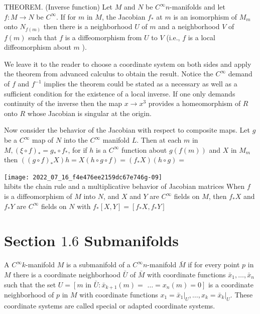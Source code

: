 \documentclass[10pt]{article}
\begin{document}
THEOREM. (Inverse function) Let $M$ and $N$ be $C^{\infty} n$-manifolds and let $f: M \rightarrow N$ be $C^{\infty}$. If for $m$ in $M$, the Jacobian $f_{*}$ at $m$ is an isomorphism of $M_{m}$ onto $N_{f(m)}$ then there is a neighborhood $U$ of $m$ and a neighborhood $V$ of $f(m)$ such that $f$ is a diffeomorphism from $U$ to $V$ (i.e., $f$ is a local diffeomorphism about $m$ ).

We leave it to the reader to choose a coordinate system on both sides and apply the theorem from advanced calculus to obtain the result. Notice the $C^{\infty}$ demand of $f$ and $f^{-1}$ implies the theorem could be stated as a necessary as well as a sufficient condition for the existence of a local inverse. If one only demands continuity of the inverse then the map $x \rightarrow x^{3}$ provides a homeomorphism of $R$ onto $R$ whose Jacobian is singular at the origin.

Now consider the behavior of the Jacobian with respect to composite maps. Let $g$ be a $C^{\infty}$ map of $N$ into the $C^{\infty}$ manifold $L$. Then at each $m$ in $M,(\xi \circ f)_{*}=g_{*} \circ f_{*}$, for if $h$ is a $C^{\infty}$ function about $g(f(m))$ and $X$ in $M_{m}$ then $\left((g \circ f)_{*} X\right) h=X(h \circ g \circ f)=\left(f_{*} X\right)(h \circ g)=$

\texttt{[image: 2022\_07\_16\_f4e476ee2159dc67e746g-09]}\\
hibits the chain rule and a multiplicative behavior of Jacobian matrices When $f$ is a diffeomorphism of $M$ into $N$, and $X$ and $Y$ are $C^{\infty}$ fields on $M$, then $f_{*} X$ and $f_{*} Y$ are $C^{\infty}$ fields on $N$ with $f_{*}[X, Y]=\left[f_{*} X, f_{*} Y\right]$



\section{Section $1.6$ Submanifolds}
A $C^{\infty} k$-manifold $M$ is a submanifold of a $C^{\infty} n$-manifold $\bar{M}$ if for every point $p$ in $M$ there is a coordinate neighborhood $\bar{U}$ of $\bar{M}$ with coordinate functions $\bar{x}_{1}, \ldots, \bar{x}_{n}$ such that the set $U=\left[m\right.$ in $\bar{U}: \bar{x}_{k+1}(m)=$ $\left.\ldots=x_{n}(m)=0\right]$ is a coordinate neighborhood of $p$ in $M$ with coordinate functions $x_{1}=\left.\bar{x}_{1}\right|_{U}, \ldots, x_{k}=\left.\bar{x}_{k}\right|_{U}$. These coordinate systems are called special or adapted coordinate systems.
\end{document}

